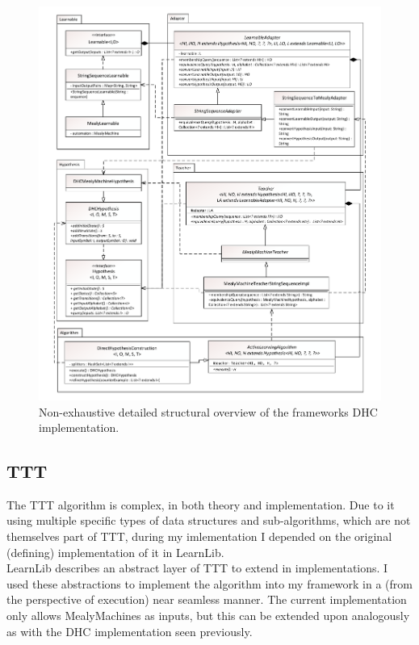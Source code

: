 \begin{figure}
	\centering
	\vspace*{-1.2cm}
	\hspace*{-1.2cm}
	\centerline{\includegraphics[width=\paperwidth,height=\paperheight,keepaspectratio]{figures/implementationdetailedoverview}}
	\caption{Non-exhaustive detailed structural overview of the frameworks DHC implementation.}
	\label{fig:impldetailedoverview}
\end{figure}

\subsection{TTT}

The TTT algorithm is complex, in both theory and implementation. Due to it using multiple specific types of data structures and sub-algorithms, which are not themselves part of TTT, during my imlementation I depended on the original (defining) implementation of it in LearnLib\cite{10.1007/978-3-319-21690-4_32}.
\\
LearnLib describes an abstract layer of TTT to extend in implementations. I used these abstractions to implement the algorithm into my framework in a (from the perspective of execution) near seamless manner. The current implementation only allows MealyMachines as inputs, but this can be extended upon analogously as with the DHC implementation seen previously.

